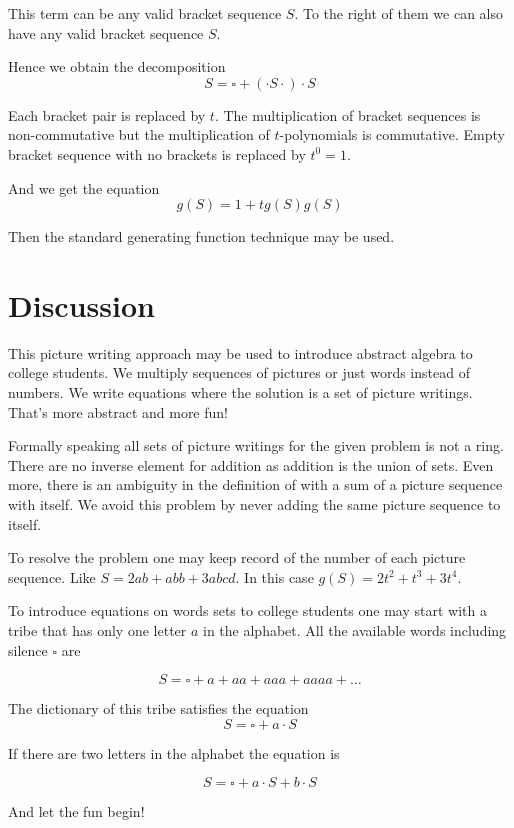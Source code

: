 \documentclass{article}
\begin{document}
This term can be any valid bracket sequence $S$. 
To the right of them we can also have any valid bracket sequence $S$. 

Hence we obtain the decomposition 
\[
S = \square + (\cdot S \cdot )\cdot S
\]

Each bracket pair is replaced by $t$. 
The multiplication of bracket sequences is non-commutative but the multiplication of $t$-polynomials is commutative. 
Empty bracket sequence with no brackets is replaced by $t^0 = 1$.

And we get the equation 
\[
g(S) = 1 + 	t g(S) g(S)
\]

Then the standard generating function technique may be used. 


\section{Discussion}


This picture writing approach may be used to introduce abstract algebra to college students. 
We multiply sequences of pictures or just words instead of numbers. 
We write equations where the solution is a set of picture writings. 
That's more abstract and more fun!

Formally speaking all sets of picture writings for the given problem is not a ring. 
There are no inverse element for addition as addition is the union of sets. 
Even more, there is an ambiguity in the definition of with a sum of a picture sequence with itself. 
We avoid this problem by never adding the same picture sequence to itself. 

To resolve the problem one may keep record of the number of each picture sequence.
Like $S = 2 ab + abb + 3 abcd$. In this case $g(S) = 2t^2 + t^3 + 3t^4$.

To introduce equations on words sets to college students one may start with a tribe 
that has only one letter $a$ in the alphabet. 
All the available words including silence $\square$ are

\[
S = \square + a + aa + aaa + aaaa + \ldots	
\]

The dictionary of this tribe satisfies the equation
\[
S = \square + a \cdot S	
\]

If there are two letters in the alphabet the equation is 

\[
S = \square + a \cdot S + b \cdot S	
\]

And let the fun begin! 


\end{document}
